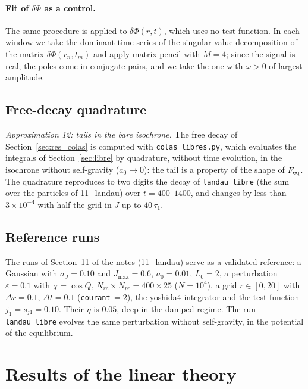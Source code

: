 \documentclass[11pt,a4paper]{article}
\begin{document}
\paragraph{Fit of $\delta\Phi$ as a control.} The same procedure is applied to $\delta\Phi(r,t)$,
which uses no test function. In each window we take the dominant time series of the
singular value decomposition of the matrix $\delta\Phi(r_n,t_m)$ and apply matrix pencil with
$M=4$; since the signal is real, the poles come in conjugate pairs, and we take the one
with $\omega>0$ of largest amplitude.

\subsection{Free-decay quadrature}
\label{sec:metodo_colas}

\emph{Approximation 12: tails in the bare isochrone.} The free decay of
Section~\ref{sec:res_colas} is computed with \texttt{colas\_\allowbreak libres.py}, which evaluates
the integrals of Section~\ref{sec:libre} by quadrature, without time evolution, in the
isochrone without self-gravity ($a_0\to0$): the tail is a property of the shape of $F_{\rm eq}$.
The quadrature reproduces to two digits the decay of \texttt{landau\_\allowbreak libre} (the sum
over the particles of 11\_landau) over $t=400$--$1400$, and changes by less than
$3\times10^{-4}$ with half the grid in $J$ up to $40\,\tau_1$.

\subsection{Reference runs}
\label{sec:landau_def}

The runs of Section~11 of the notes (11\_landau) serve as a validated reference: a
Gaussian with $\sigma_J=0.10$ and $J_{\max}=0.6$, $a_0=0.01$, $L_0=2$, a perturbation $\varepsilon=0.1$
with $\chi=\cos Q$, $N_{rc}\times N_{pc}=400\times25$ ($N=10^4$), a grid $r\in[0,20]$ with $\Delta r=0.1$,
$\Delta t=0.1$ (\texttt{courant}\,$=2$), the yoshida4 integrator and the test function
$j_1=s_{j1}=0.10$. Their $\eta$ is $0.05$, deep in the damped regime. The run
\texttt{landau\_\allowbreak libre} evolves the same perturbation without self-gravity, in the
potential of the equilibrium.

\section{Results of the linear theory}
\label{sec:lineal}
\end{document}
